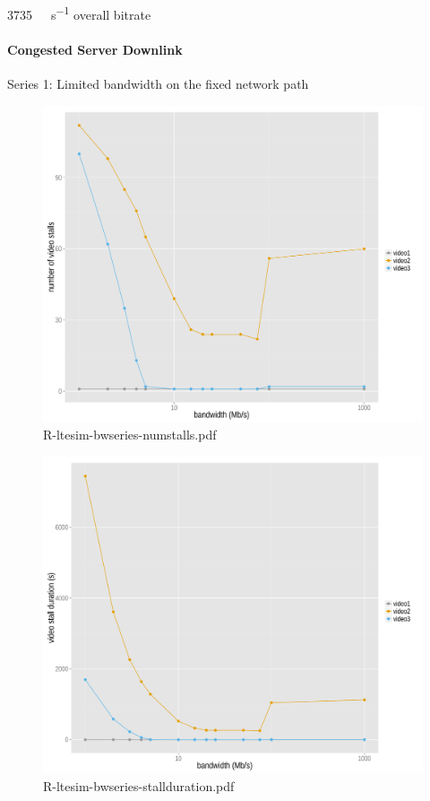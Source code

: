 \SI{3735}{\kilo\bit\per\second} overall bitrate



\paragraph{Congested Server Downlink}




Series 1: Limited bandwidth on the fixed network path



\begin{figure}[htb]
	\centering
	\includegraphics[width=1.0\textwidth]{images/R-ltesim-bwseries-numstalls.pdf}
	\caption{R-ltesim-bwseries-numstalls.pdf}
\label{c5:fig:ltesim-bwseries-numstalls}
\end{figure}

\begin{figure}[htb]
	\centering
	\includegraphics[width=1.0\textwidth]{images/R-ltesim-bwseries-stallduration.pdf}
	\caption{R-ltesim-bwseries-stallduration.pdf}
\label{c5:fig:ltesim-bwseries-stallduration}
\end{figure}


